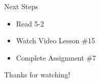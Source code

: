 \documentclass[t, aspectratio=169]{beamer}
\newcommand{\?}{\stackrel{?}{=}}
\begin{document}
	\begin{frame}{Next Steps}
		\begin{itemize}
			\item Read 5-2
			\item Watch Video Lesson \#15
			\item Complete Assignment \#7
		\end{itemize}
	
		\vfill
		
		Thanks for watching!
	\end{frame}
	
\end{document}

